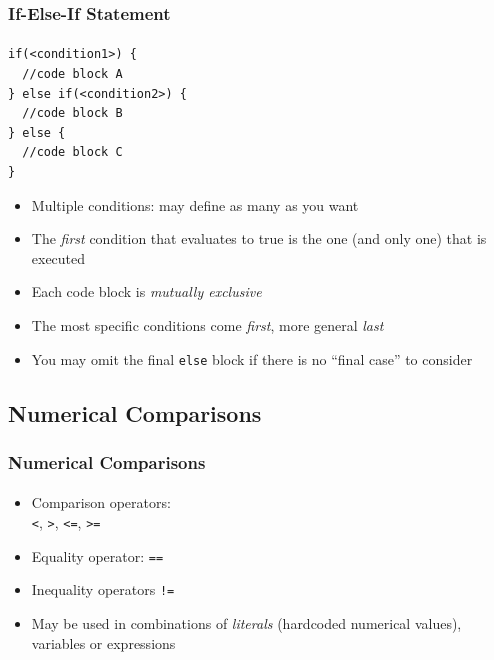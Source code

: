 \documentclass[]{beamer}
\begin{document}
\begin{frame}[fragile]
    \frametitle{If-Else-If Statement}
    \framesubtitle{}

\begin{verbatim}
if(<condition1>) {
  //code block A
} else if(<condition2>) {
  //code block B
} else {
  //code block C
}
\end{verbatim}    

\vskip-1cm
\begin{itemize}[<+->]
  \item Multiple conditions: may define as many as you want
  \item The \emph{first} condition that evaluates to true is the one (and only one) that is executed
  \item Each code block is \emph{mutually exclusive}
  \item The most specific conditions come \emph{first}, more general \emph{last}
  \item You may omit the final \texttt{else} block if there is no ``final case'' to consider
\end{itemize}

\end{frame}

\subsection{Numerical Comparisons}

\begin{frame}[fragile]
  \frametitle{Numerical Comparisons}
  \framesubtitle{}

\begin{itemize}[<+->]
  \item Comparison operators: \\
  \texttt{<}, \texttt{>}, \texttt{<=}, \texttt{>=}
  \item Equality operator: \texttt{==}
  \item Inequality operators \texttt{!=}
  \item May be used in combinations of \emph{literals} (hardcoded numerical values), variables or expressions
\end{itemize}

\end{frame}
\end{document}
